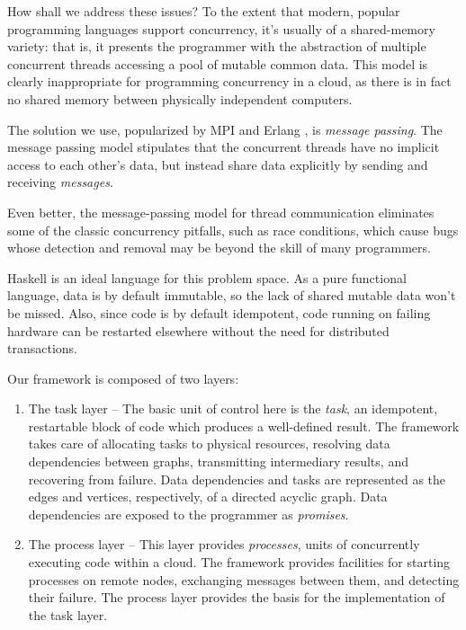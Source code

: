\documentclass[preprint]{sigplanconf}
\begin{document}
How shall we address these issues? To the extent that modern, popular programming languages support concurrency, it's usually of a shared-memory variety: that is, it presents the programmer with the abstraction of multiple concurrent threads accessing a pool of mutable common data. This model is clearly inappropriate for programming concurrency in a cloud, as there is in fact no shared memory between physically independent computers.

The solution we use, popularized by MPI \cite{mpi99} and Erlang \cite{Erlang93}, is {\em message passing}. The message passing model stipulates that the concurrent threads have no implicit access to each other's data, but instead share data explicitly by sending and receiving {\em messages}. 

Even better, the message-passing model for thread communication eliminates some of the classic concurrency pitfalls, such as race conditions, which cause bugs whose detection and removal may be beyond the skill of many programmers. 

Haskell is an ideal language for this problem space. As a pure functional language, data is by default immutable, so the lack of shared mutable data won't be missed. Also, since code is by default idempotent, code running on failing hardware can be restarted elsewhere without the need for distributed transactions.

Our framework is composed of two layers:

\begin{enumerate}
\item The task layer -- The basic unit of control here is the {\em task}, an idempotent, restartable block of code which produces a well-defined result. The framework takes care of allocating tasks to physical resources, resolving data dependencies between graphs, transmitting intermediary results, and recovering from failure. Data dependencies and tasks are represented as the edges and vertices, respectively, of a directed acyclic graph. Data dependencies are exposed to the programmer as {\em promises}.
\item The process layer -- This layer provides {\em processes}, units of concurrently executing code within a cloud. The framework provides facilities for starting processes on remote nodes, exchanging messages between them, and detecting their failure. The process layer provides the basis for the implementation of the task layer.
\end{enumerate}
\end{document}
